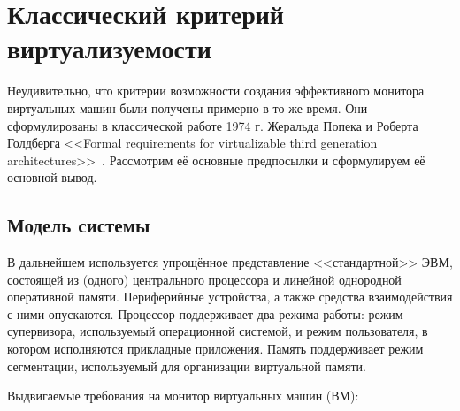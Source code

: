 \section{Классический критерий виртуализуемости}

Неудивительно, что критерии возможности создания эффективного монитора виртуальных машин были получены примерно в то же время. Они сформулированы в классической работе 1974 г. Жеральда Попека  и Роберта Голдберга <<Formal requirements for virtualizable third generation architectures>>~\cite{popek}. Рассмотрим её основные предпосылки и сформулируем её основной вывод.

\subsection{Модель системы}

В дальнейшем используется упрощённое представление <<стандартной>> ЭВМ, состоящей из (одного) центрального процессора и линейной однородной оперативной памяти. Периферийные устройства, а также средства взаимодействия с ними опускаются. Процессор поддерживает два режима работы: режим супервизора, используемый операционной системой, и режим пользователя, в котором исполняются прикладные приложения. Память поддерживает режим сегментации, используемый для организации виртуальной памяти.

Выдвигаемые требования на монитор виртуальных машин (ВМ): 

